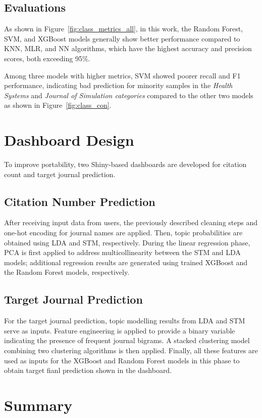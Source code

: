 \documentclass[9pt,twocolumn,twoside]{pnas-new}
\begin{document}
\subsection*{Evaluations}

As shown in Figure~\ref{fig:class_metrics_all}, in this work, the Random Forest, SVM, and XGBoost models generally show better performance compared to KNN, MLR, and NN algorithms, which have the highest accuracy and precision scores, both exceeding 95\%.

Among three models with higher metrics, SVM showed poorer recall and F1 performance, indicating bad prediction for minority samples in the \textit{Health Systems} and \textit{Journal of Simulation categories} compared to the other two models as shown in Figure~\ref{fig:class_con}.


\section{Dashboard Design}

To improve portability, two Shiny-based dashboards are developed for citation count and target journal prediction. 

\subsection*{Citation Number Prediction}
After receiving input data from users, the previously described cleaning steps and one-hot encoding for journal names are applied. Then, topic probabilities are obtained using LDA and STM, respectively.  During the linear regression phase, PCA is first applied to address multicollinearity between the STM and LDA models; additional regression results are generated using trained XGBoost and the Random Forest models, respectively.

\subsection*{Target Journal Prediction}
For the target journal prediction, topic modelling results from LDA and STM serve as inputs. Feature engineering is applied to provide a binary variable indicating the presence of frequent journal bigrams. A stacked clustering model combining two clustering algorithms is then applied. Finally, all these features are used as inputs for the XGBoost and Random Forest models in this phase to obtain target fianl prediction shown in the dashboard.


\section*{Summary}
\end{document}
